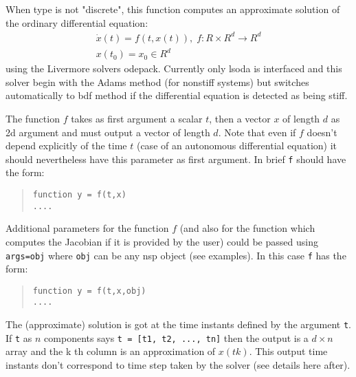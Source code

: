 \begin{mandescription}

When type is not "discrete", this function computes an approximate solution of the ordinary differential equation:
$$
\begin{array}{l}
   \dot{x}(t) = f(t, x(t)), \; f: R \times R^d \rightarrow  R^d \\
   x(t_0) = x_0  \in  R^d
\end{array}
$$
using the Livermore solvers odepack. Currently only lsoda is interfaced and this solver begin with the Adams
method (for nonstiff systems) but switches  automatically to bdf method if the differential equation is detected
as being stiff. 

The function $f$ takes as first argument a scalar $t$, then a vector $x$ of length $d$ as 2d argument and 
must output a vector of length $d$. Note that even if $f$ doesn't depend explicitly of the time $t$ (case of an autonomous differential equation)
it should nevertheless have this parameter as first argument. In brief \verb+f+ should have the
form:
\begin{quote}
{\tt function y = f(t,x) \\
      ....}
  \end{quote}

Additional parameters for the function $f$ (and also for the function which computes the Jacobian 
if it is provided by the user) could be passed using \verb+args=obj+ where \verb+obj+ can be any nsp 
object (see examples). In this case \verb+f+ has the form:
\begin{quote}
{\tt function y = f(t,x,obj) \\
      ....}
\end{quote}

The (approximate) solution is got at the time instants defined by the argument \verb+t+.
If \verb+t+ as $n$ components says  \verb+t = [t1, t2, ..., tn]+ then the output is a
$d \times n$ array and the k th column is an approximation of $x(tk)$. This output
time instants don't correspond to time step taken by the solver (see details here
after).



\end{mandescription}

